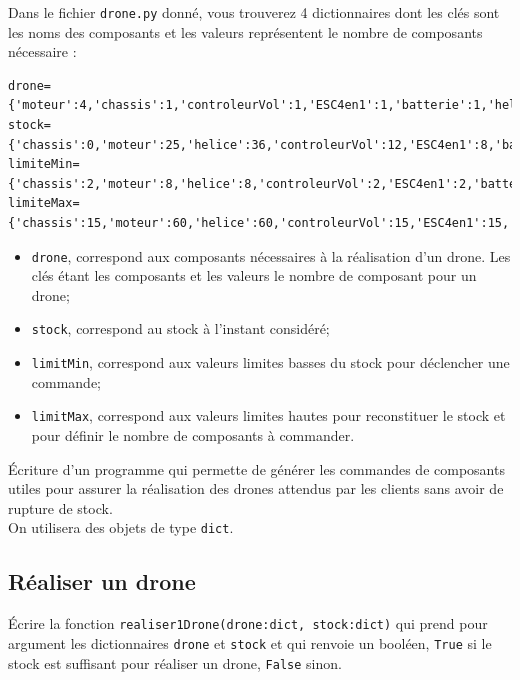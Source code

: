 Dans le fichier \lstinline{drone.py} donné, vous trouverez 4 dictionnaires dont les clés sont les noms des composants et les valeurs représentent le nombre de composants nécessaire :

\begin{lstlisting}
drone={'moteur':4,'chassis':1,'controleurVol':1,'ESC4en1':1,'batterie':1,'helice':4,'plaqueDeDistribution':1}
stock={'chassis':0,'moteur':25,'helice':36,'controleurVol':12,'ESC4en1':8,'batterie':20,'plaqueDeDistribution':7}
limiteMin={'chassis':2,'moteur':8,'helice':8,'controleurVol':2,'ESC4en1':2,'batterie':2,'plaqueDeDistribution':2}
limiteMax={'chassis':15,'moteur':60,'helice':60,'controleurVol':15,'ESC4en1':15,'batterie':30,'plaqueDeDistribution':15}
\end{lstlisting}

\begin{itemize}
\item \lstinline{drone}, correspond aux composants nécessaires à la réalisation d'un drone. Les clés étant les composants et les valeurs le nombre de composant pour un drone;
\item \lstinline{stock}, correspond au stock à l'instant considéré;
\item \lstinline{limitMin}, correspond aux valeurs limites basses du stock pour déclencher une commande;
\item \lstinline{limitMax}, correspond aux valeurs limites hautes pour reconstituer le stock et pour définir le nombre de composants à commander.
\end{itemize}

\begin{obj}
\'Ecriture d'un programme qui permette de générer les commandes de composants utiles pour assurer la réalisation des drones attendus par les clients sans avoir de rupture de stock.\\
On utilisera des objets de type \lstinline{dict}.
\end{obj}

\subsection*{Réaliser un drone}


\begin{question}
\'Ecrire la fonction \lstinline{realiser1Drone(drone:dict, stock:dict)} qui prend pour argument les dictionnaires \lstinline{drone} et \lstinline{stock} et qui renvoie un booléen, \lstinline{True} si le stock est suffisant pour réaliser un drone, \lstinline{False} sinon.
\end{question}

